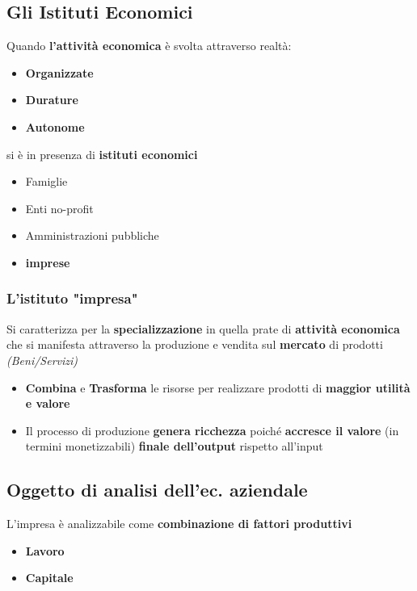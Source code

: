 \documentclass[12pt]{article}
\begin{document}
\subsection{Gli Istituti Economici}
Quando \textbf{l'attività economica} è svolta attraverso realtà:
\begin{itemize}
    \item \textbf{Organizzate}
    \item \textbf{Durature}
    \item \textbf{Autonome}
\end{itemize}
si è in presenza di \textbf{istituti economici}
\begin{itemize}
    \item Famiglie
    \item Enti no-profit
    \item Amministrazioni pubbliche
    \item \textbf{imprese}
\end{itemize}

\subsubsection{L'istituto "impresa"}
Si caratterizza per la \textbf{specializzazione} in quella prate di \textbf{attività economica} che si manifesta attraverso la produzione e vendita sul \textbf{mercato} di prodotti \textit{(Beni/Servizi)}
\begin{itemize}
    \item \textbf{Combina} e \textbf{Trasforma} le risorse per realizzare prodotti di \textbf{maggior utilità e valore}
    \item Il processo di produzione \textbf{genera ricchezza} poiché \textbf{accresce il valore} (in termini monetizzabili) \textbf{finale dell'output} rispetto all'input
\end{itemize}

\subsection{Oggetto di analisi dell'ec. aziendale}
L'impresa è analizzabile come \textbf{combinazione di fattori produttivi}
\begin{itemize}
    \item \textbf{Lavoro}
    \item \textbf{Capitale}
\end{itemize}
\end{document}

